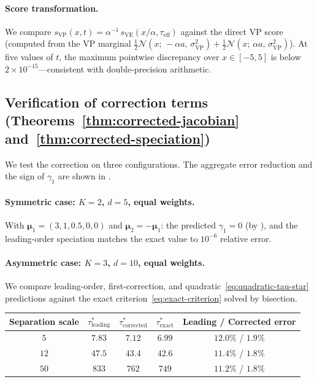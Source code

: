 \documentclass[11pt]{article}
\begin{document}
\paragraph{Score transformation.}
We compare $s_{\mathrm{VP}}(x,t) = \alpha^{-1}\,s_{\mathrm{VE}}(x/\alpha, \tau_{\mathrm{eff}})$ against the direct VP score (computed from the VP marginal $\tfrac{1}{2}\mathcal{N}(x;\, -\alpha a,\, \sigma_{\mathrm{VP}}^2) + \tfrac{1}{2}\mathcal{N}(x;\, \alpha a,\, \sigma_{\mathrm{VP}}^2)$).
At five values of $t$, the maximum pointwise discrepancy over $x \in [-5,5]$ is below $2 \times 10^{-15}$---consistent with double-precision arithmetic.

\subsection{Verification of correction terms (Theorems~\ref{thm:corrected-jacobian} and~\ref{thm:corrected-speciation})}\label{sec:exp:correction}

We test the correction on three configurations.
The aggregate error reduction and the sign of $\gamma_1$ are shown in .

\paragraph{Symmetric case: $K = 2$, $d = 5$, equal weights.}
With $\bm{\mu}_1 = (3,1,0.5,0,0)$ and $\bm{\mu}_2 = -\bm{\mu}_1$:
the predicted $\gamma_1 = 0$ (by ), and the leading-order speciation matches the exact value to $10^{-6}$ relative error.

\paragraph{Asymmetric case: $K = 3$, $d = 10$, equal weights.}
We compare leading-order, first-correction, and quadratic~\eqref{eq:quadratic-tau-star} predictions against the exact criterion~\eqref{eq:exact-criterion} solved by bisection.

\begin{center}
\begin{tabular}{ccccc}
\toprule
Separation scale & $\tau^\ast_{\text{leading}}$ & $\tau^\ast_{\text{corrected}}$ & $\tau^\ast_{\text{exact}}$ & Leading / Corrected error \\
\midrule
$5$  & $7.83$ & $7.12$ & $6.99$ & $12.0\%$ / $1.9\%$ \\
$12$ & $47.5$ & $43.4$ & $42.6$ & $11.4\%$ / $1.8\%$ \\
$50$ & $833$  & $762$  & $749$  & $11.2\%$ / $1.8\%$ \\
\bottomrule
\end{tabular}
\end{center}
\end{document}
